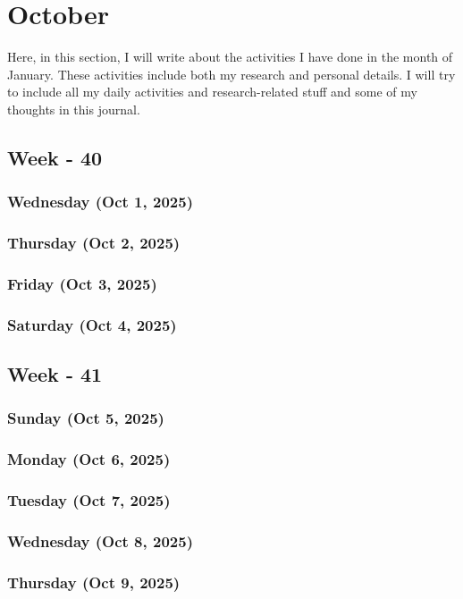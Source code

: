 \chapter{October}
\label{chap:October}
\hspace{1cm}
Here, in this section, I will write about the activities I have done in the month of January. These activities include both my research and personal details. I will try to include all my daily activities and research-related stuff and some of my thoughts in this journal.

\section{Week - 40}
\subsection*{Wednesday (Oct 1, 2025)}
\subsection*{Thursday (Oct 2, 2025)}
\subsection*{Friday (Oct 3, 2025)}
\subsection*{Saturday (Oct 4, 2025)}

\section{Week - 41}
\subsection*{Sunday (Oct 5, 2025)}
\subsection*{Monday (Oct 6, 2025)}
\subsection*{Tuesday (Oct 7, 2025)}
\subsection*{Wednesday (Oct 8, 2025)}
\subsection*{Thursday (Oct 9, 2025)}

